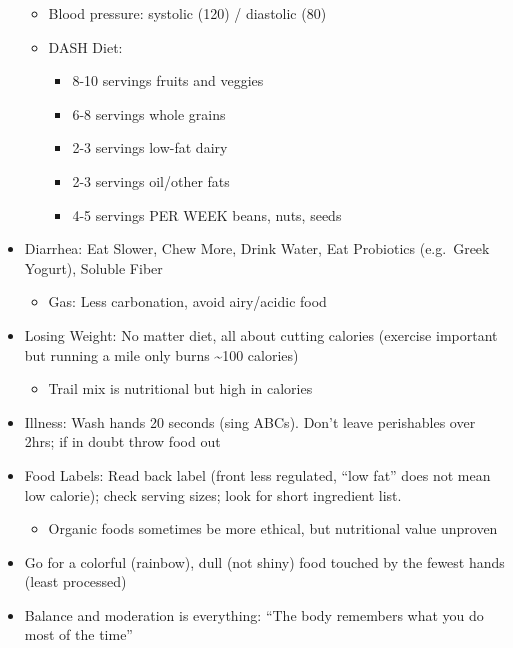 \documentclass[
]{article}
\providecommand{\tightlist}{%
  \setlength{\itemsep}{0pt}\setlength{\parskip}{0pt}}
\begin{document}
\begin{itemize}
  \begin{itemize}
  \item
    Blood pressure: systolic (120) / diastolic (80)
  \item
    DASH Diet:

    \begin{itemize}
    \item
      8-10 servings fruits and veggies
    \item
      6-8 servings whole grains
    \item
      2-3 servings low-fat dairy
    \item
      2-3 servings oil/other fats
    \item
      4-5 servings PER WEEK beans, nuts, seeds
    \end{itemize}
  \end{itemize}
\item
  Diarrhea: Eat Slower, Chew More, Drink Water, Eat Probiotics
  (e.g.~Greek Yogurt), Soluble Fiber

  \begin{itemize}
  \tightlist
  \item
    Gas: Less carbonation, avoid airy/acidic food
  \end{itemize}
\item
  Losing Weight: No matter diet, all about cutting calories (exercise
  important but running a mile only burns \textasciitilde100 calories)

  \begin{itemize}
  \tightlist
  \item
    Trail mix is nutritional but high in calories
  \end{itemize}
\item
  Illness: Wash hands 20 seconds (sing ABCs). Don't leave perishables
  over 2hrs; if in doubt throw food out
\item
  Food Labels: Read back label (front less regulated, ``low fat'' does
  not mean low calorie); check serving sizes; look for short ingredient
  list.

  \begin{itemize}
  \tightlist
  \item
    Organic foods sometimes be more ethical, but nutritional value
    unproven
  \end{itemize}
\item
  Go for a colorful (rainbow), dull (not shiny) food touched by the
  fewest hands (least processed)
\item
  Balance and moderation is everything: ``The body remembers what you do
  most of the time''


\end{itemize}
\end{document}
